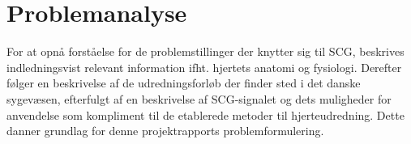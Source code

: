 \chapter{Problemanalyse}
For at opnå forståelse for de problemstillinger der knytter sig til SCG, beskrives indledningsvist relevant information ifht. hjertets anatomi og fysiologi. Derefter følger en beskrivelse af de udredningsforløb der finder sted i det danske sygevæsen, efterfulgt af en beskrivelse af SCG-signalet og dets muligheder for anvendelse som kompliment til de etablerede metoder til hjerteudredning.
Dette danner grundlag for denne projektrapports problemformulering.